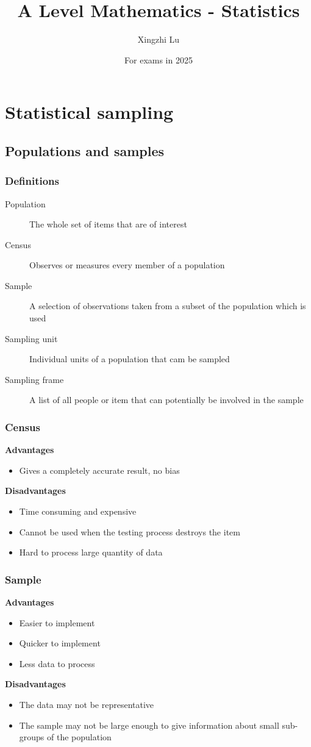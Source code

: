 \documentclass[A4paper, 11pt]{article}
\title{A Level Mathematics - Statistics}
\author{Xingzhi Lu}
\date{For exams in 2025}
\begin{document}
	\maketitle
	\section{Statistical sampling}
	
	\subsection{Populations and samples}
	\subsubsection{Definitions}
	\begin{description}
		\item[Population] The whole set of items that are of interest
		\item[Census] Observes or measures every member of a population
		\item[Sample] A selection of observations taken from a subset of the population which is used
		\item[Sampling unit] Individual units of a population that cam be sampled
		\item[Sampling frame] A list of all people or item that can potentially be involved in the sample
	\end{description}
	
	\subsubsection{Census}
	\textbf{Advantages}
	\begin{itemize}
		\item Gives a completely accurate result, no bias
	\end{itemize}
	\textbf{Disadvantages}
	\begin{itemize}
		\item Time consuming and expensive
		\item Cannot be used when the testing process destroys the item
		\item Hard to process large quantity of data
	\end{itemize}
	\subsubsection{Sample}
	\textbf{Advantages}
	\begin{itemize}
		\item Easier to implement
		\item Quicker to implement
		\item Less data to process
	\end{itemize}
	\textbf{Disadvantages}
	\begin{itemize}
		\item The data may not be representative
		\item The sample may not be large enough to give information about small sub-groups of the population
	\end{itemize}
\end{document}
